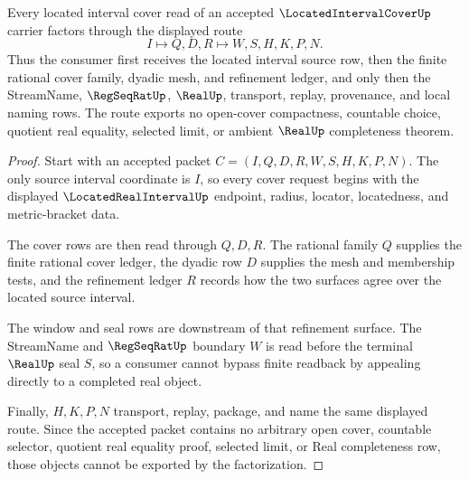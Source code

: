 \begin{theorem}
\label{thm:located-interval-cover-refinement-route}
Every located interval cover read of an accepted $\LocatedIntervalCoverUp$ carrier factors through the displayed route
$$
I \longmapsto Q,D,R \longmapsto W,S,H,K,P,N .
$$
Thus the consumer first receives the located interval source row, then the finite rational cover family, dyadic mesh, and refinement ledger, and only then the StreamName, $\RegSeqRatUp$, $\RealUp$, transport, replay, provenance, and local naming rows. The route exports no open-cover compactness, countable choice, quotient real equality, selected limit, or ambient $\RealUp$ completeness theorem.
\end{theorem}
\begin{proof}
Start with an accepted packet $C=(I,Q,D,R,W,S,H,K,P,N)$. The only source interval coordinate is $I$, so every cover request begins with the displayed $\LocatedRealIntervalUp$ endpoint, radius, locator, locatedness, and metric-bracket data.

The cover rows are then read through $Q,D,R$. The rational family $Q$ supplies the finite rational cover ledger, the dyadic row $D$ supplies the mesh and membership tests, and the refinement ledger $R$ records how the two surfaces agree over the located source interval.

The window and seal rows are downstream of that refinement surface. The StreamName and $\RegSeqRatUp$ boundary $W$ is read before the terminal $\RealUp$ seal $S$, so a consumer cannot bypass finite readback by appealing directly to a completed real object.

Finally, $H,K,P,N$ transport, replay, package, and name the same displayed route. Since the accepted packet contains no arbitrary open cover, countable selector, quotient real equality proof, selected limit, or Real completeness row, those objects cannot be exported by the factorization.
\end{proof}



